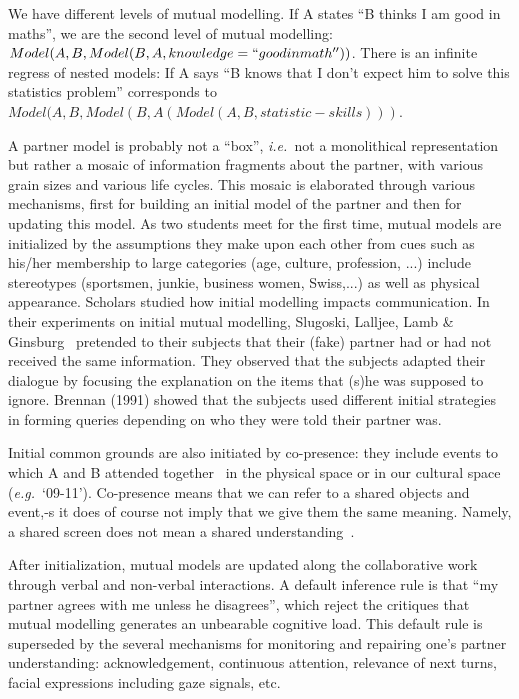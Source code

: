 \documentclass[twocolumn]{article}
\newcommand{\ie}{{\textit{i.e.\ }}}
\newcommand{\eg}{{\textit{e.g.\ }}}
\begin{document}
We have different levels of mutual modelling. If A states ``B thinks I am good in
maths'', we are the second level of mutual modelling:  $Model(A, B, Model(B,A,
knowledge=``good in math''))$. There is an infinite regress of nested models: If A
says ``B knows that I don't expect him to solve this statistics problem''
corresponds to $Model(A, B, Model (B, A (Model (A,B, statistic-skills)))$.

A partner model is probably not a ``box'', \ie not a monolithical representation
but rather a mosaic of information fragments about the partner, with various
grain sizes and various life cycles. This mosaic is elaborated through various
mechanisms, first for building an initial model of the partner and then for
updating this model.  As two students meet for the first time, mutual models are
initialized by the assumptions they make upon each other from cues such as
his/her membership to large categories (age, culture, profession, ...) include
stereotypes (sportsmen, junkie, business women, Swiss,...) as well as physical
appearance. Scholars studied how initial modelling impacts communication. In
their experiments on initial mutual modelling, Slugoski, Lalljee, Lamb \&
Ginsburg~\citep{slugoski1993attribution} pretended to their subjects that their
(fake) partner had or had not received the same information. They observed that
the subjects adapted their dialogue by focusing the explanation on the items
that (s)he was supposed to ignore. Brennan (1991)  showed that the subjects used
different initial strategies in forming queries depending on who they were told
their partner was.  

Initial common grounds are also initiated by co-presence: they include events to
which A and B attended together~\citep{clark2002definite} in the physical space
or in our cultural space (\eg ‘09-11'). Co-presence means that we can refer to
a shared objects and event,-s it does of course not imply that we give them the
same meaning. Namely, a shared screen does not mean a shared
understanding~\citep{dillenbourg2006sharing}.

After initialization, mutual models are updated along the collaborative work
through verbal and non-verbal interactions. A default inference rule is that ``my
partner agrees with me unless he disagrees'', which reject the critiques that
mutual modelling generates an unbearable cognitive load. This default rule is
superseded by the several mechanisms for monitoring and repairing one's partner
understanding: acknowledgement, continuous attention, relevance of next turns,
facial expressions including gaze signals, etc.
\end{document}
